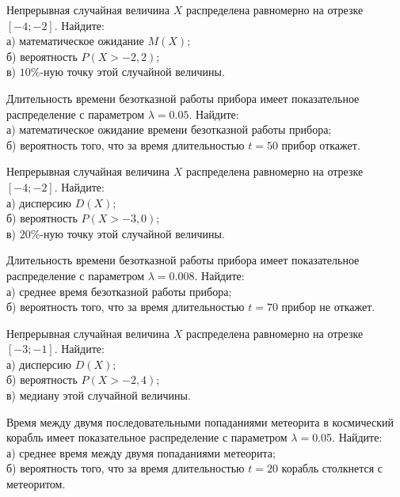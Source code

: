 \vfill

\newpage\setcounter{zad}{0}

\z Непрерывная случайная величина $X$ распределена равномерно на отрезке $[-4; -2]$. Найдите: \\ \quad а) математическое ожидание $M(X)$; \\ \quad б) вероятность $P(X>-2{,}2)$; \\ \quad в) $10\%$-ную точку этой случайной величины.


\vfill

\z Длительность времени безотказной работы прибора имеет показательное распределение с параметром $\lambda = 0.05$. Найдите: \\ \quad а) математическое ожидание времени безотказной работы прибора; \\ \quad б) вероятность того, что за время длительностью $t = 50$ прибор  откажет.
 

\vfill

\newpage\setcounter{zad}{0}

\z Непрерывная случайная величина $X$ распределена равномерно на отрезке $[-4; -2]$. Найдите: \\ \quad а) дисперсию $D(X)$; \\ \quad б) вероятность $P(X>-3{,}0)$; \\ \quad в) $20\%$-ную точку этой случайной величины.


\vfill

\z Длительность времени безотказной работы прибора имеет показательное распределение с параметром $\lambda = 0.008$. Найдите: \\ \quad а) среднее время безотказной работы прибора; \\ \quad б) вероятность того, что за время длительностью $t = 70$ прибор не откажет.
 

\vfill

\newpage\setcounter{zad}{0}

\z Непрерывная случайная величина $X$ распределена равномерно на отрезке $[-3; -1]$. Найдите: \\ \quad а) дисперсию $D(X)$; \\ \quad б) вероятность $P(X>-2{,}4)$; \\ \quad в) медиану этой случайной величины.


\vfill

\z Время между двумя последовательными попаданиями метеорита в космический корабль имеет показательное распределение с параметром $\lambda = 0.05$. Найдите: \\ \quad а) среднее время между двумя попаданиями метеорита; \\ \quad б) вероятность того, что за время длительностью $t = 20$ корабль  столкнется с метеоритом.
 

